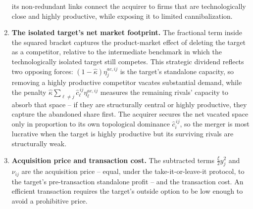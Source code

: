 \documentclass[12pt]{article}
\begin{document}
\begin{spacing}{2}
\begin{enumerate}
its non-redundant links connect the acquirer to firms that are technologically
close and highly productive, while exposing it to limited cannibalization.
    \item \textbf{The isolated target's net market footprint.} The fractional term
inside the squared bracket captures the product-market effect of deleting the
target as a competitor, relative to the intermediate benchmark in which the
technologically isolated target still competes. This strategic dividend
reflects two opposing forces: $(1-\widehat\kappa)\eta_j^{ac,ij}$ is the
target's standalone capacity, so removing a highly productive competitor
vacates substantial demand, while the penalty
$\widehat\kappa \sum_{\ell \neq j}\widehat c_\ell^{\,ij}\eta_\ell^{ac,ij}$
measures the remaining rivals' capacity to absorb that space -- if they are
structurally central or highly productive, they capture the abandoned share
first. The acquirer secures the net vacated space only in proportion to its own
topological dominance $\widehat c_i^{\,ij}$, so the merger is most lucrative
when the target is highly productive but its surviving rivals are structurally
weak.
\item \textbf{Acquisition price and transaction cost.} The subtracted terms
$\frac{\xi}{2}y_j^2$ and $\nu_{ij}$ are the acquisition price -- equal, under
the take-it-or-leave-it protocol, to the target's pre-transaction standalone
profit -- and the transaction cost. An efficient transaction requires the
target's outside option to be low enough to avoid a prohibitive price.
\end{enumerate}


\end{spacing}
\end{document}
